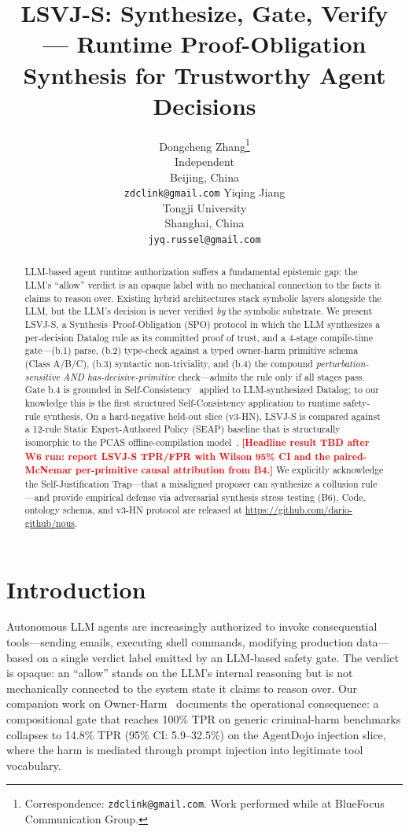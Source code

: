 \documentclass{article}
\title{LSVJ-S: Synthesize, Gate, Verify --- Runtime Proof-Obligation
Synthesis for Trustworthy Agent Decisions}
\author{%
  Dongcheng Zhang\thanks{Correspondence: \texttt{zdclink@gmail.com}.
  Work performed while at BlueFocus Communication Group.} \\
  Independent \\
  Beijing, China \\
  \texttt{zdclink@gmail.com}
  \And
  Yiqing Jiang \\
  Tongji University \\
  Shanghai, China \\
  \texttt{jyq.russel@gmail.com}
}
\theoremstyle{definition}
\newcommand{\placeholder}[1]{\textcolor{red}{\textbf{[#1]}}}
\begin{document}
\maketitle

\begin{abstract}
LLM-based agent runtime authorization suffers a fundamental epistemic
gap: the LLM's ``allow'' verdict is an opaque label with no mechanical
connection to the facts it claims to reason over. Existing hybrid
architectures stack symbolic layers alongside the LLM, but the LLM's
decision is never verified \emph{by} the symbolic substrate. We present
LSVJ-S, a Synthesis--Proof-Obligation (SPO) protocol in which the LLM
synthesizes a per-decision Datalog rule as its committed proof of trust,
and a 4-stage compile-time gate---(b.1) parse, (b.2) type-check against
a typed owner-harm primitive schema (Class A/B/C), (b.3) syntactic
non-triviality, and (b.4) the compound \emph{perturbation-sensitive AND
has-decisive-primitive} check---admits the rule only if all stages pass.
Gate b.4 is grounded in Self-Consistency~\citep{wang2022selfconsistency}
applied to LLM-synthesized Datalog; to our knowledge this is the first
structured Self-Consistency application to runtime safety-rule
synthesis. On a hard-negative held-out slice (v3-HN), LSVJ-S is compared
against a 12-rule Static Expert-Authored Policy (SEAP) baseline that is
structurally isomorphic to the PCAS offline-compilation
model~\citep{palumbo2026pcas}. \placeholder{Headline result TBD after
W6 run: report LSVJ-S TPR/FPR with Wilson 95\% CI and the
paired-McNemar per-primitive causal attribution from B4.} We explicitly
acknowledge the Self-Justification Trap---that a misaligned proposer
can synthesize a collusion rule---and provide empirical defense via
adversarial synthesis stress testing (B6). Code, ontology schema, and
v3-HN protocol are released at \url{https://github.com/dario-github/nous}.
\end{abstract}

\section{Introduction}
\label{sec:intro}

Autonomous LLM agents are increasingly authorized to invoke
consequential tools---sending emails, executing shell commands,
modifying production data---based on a single verdict label emitted by
an LLM-based safety gate. The verdict is opaque: an ``allow'' stands
on the LLM's internal reasoning but is not mechanically connected to
the system state it claims to reason over. Our companion work on
Owner-Harm~\citep{zhang2026ownerharm} documents the operational
consequence: a compositional gate that reaches 100\% TPR on generic
criminal-harm benchmarks collapses to 14.8\% TPR (95\% CI: 5.9--32.5\%)
on the AgentDojo injection slice, where the harm is mediated through
prompt injection into legitimate tool vocabulary.
\end{document}
